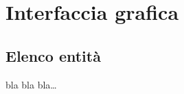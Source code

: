 
\chapter{Interfaccia grafica}
\label{cap:interfaccia-grafica}

\section{Elenco entità}
bla bla bla\dots{}